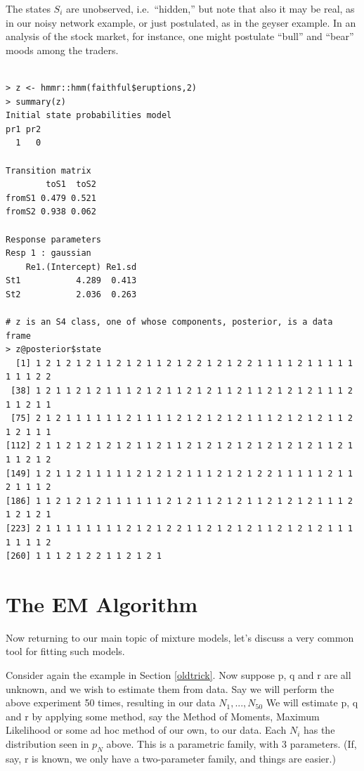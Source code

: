 \documentclass[11pt]{article}
\begin{document}
The states $S_i$ are unobserved, i.e.\ ``hidden,'' but note that also it
may be real, as in our noisy network example, or just postulated, as in
the geyser example.  In an analysis of the stock market, for instance,
one might postulate ``bull'' and ``bear'' moods among the traders.

\begin{lstlisting}

> z <- hmmr::hmm(faithful$eruptions,2)
> summary(z)
Initial state probabilities model 
pr1 pr2 
  1   0 

Transition matrix 
        toS1  toS2
fromS1 0.479 0.521
fromS2 0.938 0.062

Response parameters 
Resp 1 : gaussian 
    Re1.(Intercept) Re1.sd
St1           4.289  0.413
St2           2.036  0.263

# z is an S4 class, one of whose components, posterior, is a data frame
> z@posterior$state
  [1] 1 2 1 2 1 2 1 1 2 1 2 1 1 2 1 2 2 1 2 1 2 2 1 1 1 1 2 1 1 1 1 1 1 1 1 2 2
 [38] 1 2 1 1 2 1 2 1 1 1 2 1 2 1 1 2 1 2 1 1 2 1 1 2 1 2 1 2 1 1 1 2 1 1 2 1 1
 [75] 2 1 2 1 1 1 1 1 1 2 1 1 1 1 2 1 2 1 2 1 2 1 1 1 2 1 2 1 2 1 1 2 1 2 1 1 1
[112] 2 1 1 2 1 2 1 2 1 2 1 1 2 1 1 2 1 2 1 2 1 2 1 2 1 2 1 2 1 1 2 1 1 1 2 1 2
[149] 1 2 1 1 2 1 1 1 1 1 2 1 2 1 2 1 1 1 2 1 2 1 2 2 1 1 1 1 1 2 1 1 2 1 1 1 2
[186] 1 1 2 1 2 1 2 1 1 1 1 1 1 2 1 2 1 1 2 1 2 1 1 2 1 2 1 2 1 1 1 2 1 2 1 2 1
[223] 2 1 1 1 1 1 1 1 1 2 1 2 1 2 2 1 1 2 1 2 1 2 1 1 2 1 2 1 2 1 1 1 1 1 1 1 2
[260] 1 1 1 2 1 2 2 1 1 2 1 2 1

\end{lstlisting}

\section{The EM Algorithm} 
\label{emalg}

Now returning to our main topic of mixture models, let's discuss a very
common tool for fitting such models.

Consider again the example in Section \ref{oldtrick}.  Now suppose p, q
and r are all unknown, and we wish to estimate them from data. Say we
will perform the above experiment 50 times, resulting in our data
$N_1,...,N_{50}$ We will estimate p, q and r by applying some method,
say the Method of Moments, Maximum Likelihood or some ad hoc method of
our own, to our data. Each $N_i$ has the distribution seen in $p_N$
above. This is a parametric family, with 3 parameters. (If, say, r is
known, we only have a two-parameter family, and things are easier.)
\end{document}
